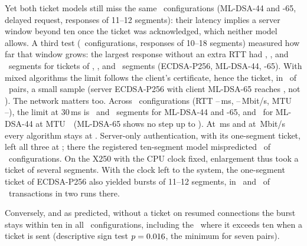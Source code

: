 \documentclass[sigconf,9pt,nonacm]{acmart}
\newcommand{\ms}{\,ms\xspace}
\begin{document}
Yet both ticket models still miss the same \DBothWrong\ configurations (ML-DSA-44 and -65, delayed request, responses of 11--12 segments): their latency implies a server window beyond ten once the ticket was acknowledged, which neither model allows. A third test (\EN\ configurations, responses of 10--18 segments) measured how far that window grows: the largest response without an extra RTT had \EFitEcdsa, \EFitMlFourFour, and \EFitMlSixFive\ segments for tickets of \NstSegEc, \NstSegMlFourFour, and \NstSegMlSixFive\ segments (ECDSA-P256, ML-DSA-44, -65). With mixed algorithms the limit follows the client's certificate, hence the ticket, in \MixRight\ of \MixN\ pairs, a small sample (server ECDSA-P256 with client ML-DSA-65 reaches \MixFitExc, not \MixPredExc). The network matters too. Across \GenCells\ configurations (RTT \GenRttLo--\GenRttHi\ms, \GenRateLo--\GenRateHi\,Mbit/s, MTU \GenMtuLo--\GenMtuHi), the limit at 30\ms is \GenWMFourFourRttThirty\ and \GenWMSixFiveRttThirty\ segments for ML-DSA-44 and -65, and \GenWMFourFourMtuLow\ for ML-DSA-44 at MTU~\GenMtuLo\ (ML-DSA-65 shows no step up to \GenRespMax). At \GenRttLo\ms and at \GenRateLo\,Mbit/s every algorithm stays at \GenWEcRttFive. Server-only authentication, with its one-segment ticket, left all three at \ServWindow; there the registered ten-segment model mispredicted \ServWrong\ of \ServCells\ configurations. On the X250 with the CPU clock fixed, enlargement thus took a ticket of several segments. With the clock left to the system, the one-segment ticket of ECDSA-P256 also yielded bursts of 11--12 segments, in \BuUrEcUp\ and \BuUtEcUp\ of \BuUrEcN\ transactions in two runs there.

Conversely, and as predicted, without a ticket on resumed connections the burst stays within ten in all \NtkCells\ configurations, including the \NtkEffect\ where it exceeds ten when a ticket is sent (descriptive sign test $p=0.016$, the minimum for seven pairs).
\end{document}
